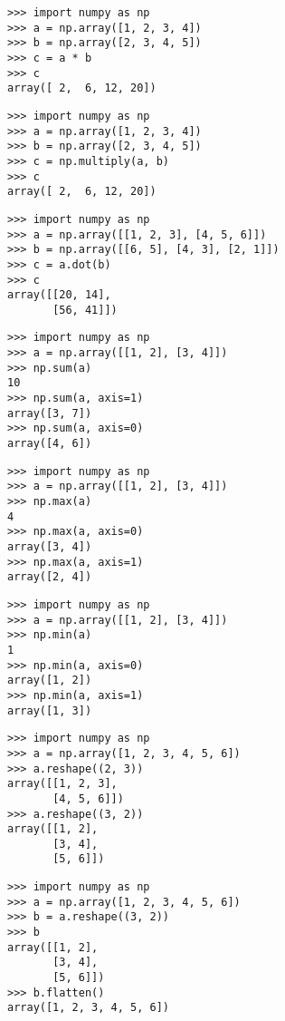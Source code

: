 \begin{verbatim}
>>> import numpy as np
>>> a = np.array([1, 2, 3, 4])
>>> b = np.array([2, 3, 4, 5])
>>> c = a * b
>>> c
array([ 2,  6, 12, 20])
\end{verbatim}

\begin{verbatim}
>>> import numpy as np
>>> a = np.array([1, 2, 3, 4])
>>> b = np.array([2, 3, 4, 5])
>>> c = np.multiply(a, b)
>>> c
array([ 2,  6, 12, 20])
\end{verbatim}

\begin{verbatim}
>>> import numpy as np
>>> a = np.array([[1, 2, 3], [4, 5, 6]])
>>> b = np.array([[6, 5], [4, 3], [2, 1]])
>>> c = a.dot(b)
>>> c
array([[20, 14],
       [56, 41]])
\end{verbatim}

\begin{verbatim}
>>> import numpy as np
>>> a = np.array([[1, 2], [3, 4]])
>>> np.sum(a)
10
>>> np.sum(a, axis=1)
array([3, 7])
>>> np.sum(a, axis=0)
array([4, 6])
\end{verbatim}

\begin{verbatim}
>>> import numpy as np
>>> a = np.array([[1, 2], [3, 4]])
>>> np.max(a)
4
>>> np.max(a, axis=0)
array([3, 4])
>>> np.max(a, axis=1)
array([2, 4])
\end{verbatim}

\begin{verbatim}
>>> import numpy as np
>>> a = np.array([[1, 2], [3, 4]])
>>> np.min(a)
1
>>> np.min(a, axis=0)
array([1, 2])
>>> np.min(a, axis=1)
array([1, 3])
\end{verbatim}

\begin{verbatim}
>>> import numpy as np
>>> a = np.array([1, 2, 3, 4, 5, 6])
>>> a.reshape((2, 3))
array([[1, 2, 3],
       [4, 5, 6]])
>>> a.reshape((3, 2))
array([[1, 2],
       [3, 4],
       [5, 6]])
\end{verbatim}

\begin{verbatim}
>>> import numpy as np
>>> a = np.array([1, 2, 3, 4, 5, 6])
>>> b = a.reshape((3, 2))
>>> b
array([[1, 2],
       [3, 4],
       [5, 6]])
>>> b.flatten()
array([1, 2, 3, 4, 5, 6])
\end{verbatim}


